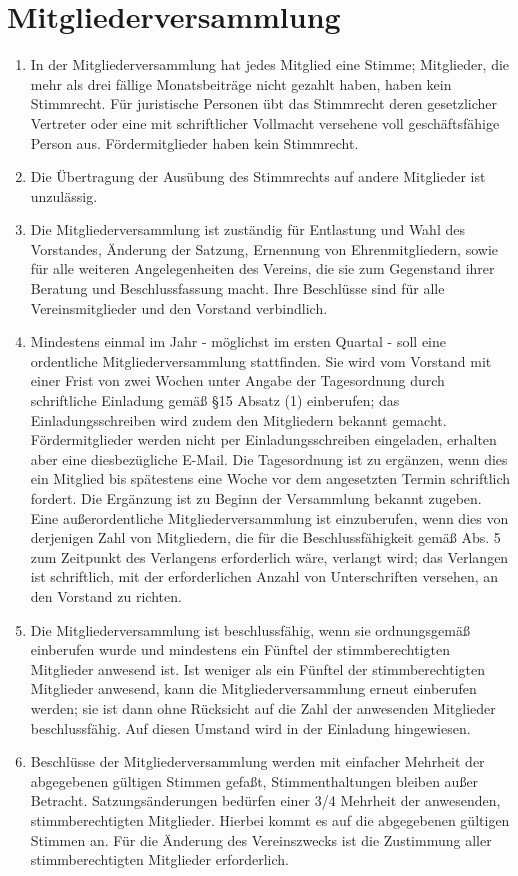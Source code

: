 \documentclass[ngerman]{scrartcl}
\begin{document}
\section{Mitgliederversammlung} \label{sec:mitgliederversammlung}
\begin{enumerate}
 \item In der Mitgliederversammlung hat jedes Mitglied eine Stimme; 
 Mitglieder, die mehr als drei fällige Monatsbeiträge nicht gezahlt 
 haben, haben kein Stimmrecht. Für juristische Personen übt das 
 Stimmrecht deren gesetzlicher Vertreter  oder eine mit schriftlicher 
 Vollmacht versehene voll geschäftsfähige Person aus. Fördermitglieder
 haben kein Stimmrecht.
 \item Die Übertragung der Ausübung des Stimmrechts auf andere
 Mitglieder ist unzulässig.
 \item Die Mitgliederversammlung ist zuständig für Entlastung
 und Wahl des Vorstandes, Änderung der Satzung, Ernennung von
 Ehrenmitgliedern, sowie für alle weiteren Angelegenheiten des
 Vereins, die sie zum Gegenstand ihrer Beratung und
 Beschlussfassung macht. Ihre Beschlüsse sind für alle
 Vereinsmitglieder und den Vorstand verbindlich.
 \item Mindestens einmal im Jahr - möglichst im ersten Quartal -
 soll eine ordentliche Mitgliederversammlung stattfinden. Sie
 wird vom Vorstand mit einer Frist von zwei Wochen unter
 Angabe der Tagesordnung durch schriftliche Einladung gemäß
 §15 Absatz (1) einberufen; das Einladungsschreiben wird zudem
 den Mitgliedern bekannt gemacht. Fördermitglieder werden nicht
 per Einladungsschreiben eingeladen, erhalten aber eine diesbezügliche
 E-Mail. Die Tagesordnung ist zu ergänzen,
 wenn dies ein Mitglied bis spätestens eine Woche vor dem
 angesetzten Termin schriftlich fordert. Die Ergänzung ist zu
 Beginn der Versammlung bekannt zugeben. Eine außerordentliche
 Mitgliederversammlung ist einzuberufen, wenn dies von
 derjenigen Zahl von Mitgliedern, die für die
 Beschlussfähigkeit gemäß Abs. 5 zum Zeitpunkt des Verlangens
 erforderlich wäre, verlangt wird; das Verlangen ist
 schriftlich, mit der erforderlichen Anzahl von Unterschriften
 versehen, an den Vorstand zu richten.
 \item Die Mitgliederversammlung ist beschlussfähig, wenn sie
 ordnungsgemäß einberufen wurde und mindestens ein Fünftel der
 stimmberechtigten Mitglieder anwesend ist. Ist weniger als
 ein Fünftel der stimmberechtigten Mitglieder anwesend, kann
 die  Mitgliederversammlung erneut einberufen werden; sie ist
 dann ohne Rücksicht auf die Zahl der anwesenden Mitglieder
 beschlussfähig. Auf diesen Umstand wird in der Einladung
 hingewiesen.
 \item Beschlüsse der Mitgliederversammlung werden mit einfacher
 Mehrheit der abgegebenen gültigen Stimmen gefaßt,
 Stimmenthaltungen bleiben außer Betracht. Satzungsänderungen
 bedürfen einer 3/4 Mehrheit der anwesenden, stimmberechtigten
 Mitglieder. Hierbei kommt es auf die abgegebenen gültigen
 Stimmen an. Für die Änderung des Vereinszwecks ist die
 Zustimmung aller stimmberechtigten Mitglieder erforderlich.
\end{enumerate}
\end{document}
